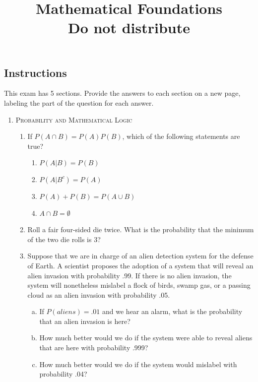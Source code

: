 \documentclass[11pt,letterpaper]{article}
\title{Mathematical Foundations\\Do not distribute}
\numberwithin{equation}{section}
\begin{document}
\maketitle
\subsection*{Instructions}
This exam has 5 sections.  Provide the answers to each section on a new page, labeling the part of the question for each answer.  
\begin{enumerate}[I]
\item \textsc{Probability and Mathematical Logic }
\begin{enumerate}[1)]
\item If $P(A\cap B)=P(A)P(B)$, which of the following statements are true?
\begin{enumerate}
\item[a)] $P(A|B)=P(B)$ 
\item[b)] $P(A|B^c)=P(A)$ 
\item[c)] $P(A)+P(B)=P(A\cup B)$ 
\item[d)] $A\cap B=\emptyset$
\end{enumerate}


\item Roll a fair four-sided die twice. What is the probability that the minimum of the two die rolls is 3?

\item Suppose that we are in charge of an alien detection system for the defense of Earth.  A scientist proposes the adoption of a system that will reveal an alien invasion with probability .99.  If there is no alien invasion, the system will nonetheless mislabel a flock of birds, swamp gas, or a passing cloud as an alien invasion with probability .05. 
 
\begin{enumerate}[a)]
\item If $P(aliens)=.01$ and we hear an alarm, what is the probability that an alien invasion is here? 

\item How much better would we do if the system were able to reveal aliens that are here with probability .999?
\item How much better would we do if the system would mislabel with probability .04?
\end{enumerate}



\end{enumerate}
\end{enumerate}
\end{document}
